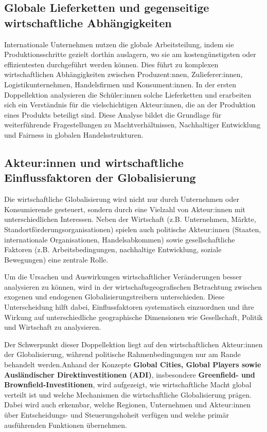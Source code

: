\subsection{Globale Lieferketten und gegenseitige wirtschaftliche Abhängigkeiten}
Internationale Unternehmen nutzen die globale Arbeitsteilung, indem sie Produktionsschritte gezielt dorthin auslagern, wo sie am kostengünstigsten oder effizientesten durchgeführt werden können. Dies führt zu komplexen wirtschaftlichen Abhängigkeiten zwischen Produzent:nnen, Zulieferer:innen, Logistikunternehmen, Handelsfirmen und Konsument:innen. In der ersten Doppellektion analysieren die Schüler:innen solche Lieferketten und erarbeiten sich ein Verständnis für die vielschichtigen Akteur:innen, die an der Produktion eines Produkts beteiligt sind. Diese Analyse bildet die Grundlage für weiterführende Fragestellungen zu Machtverhältnissen, Nachhaltiger Entwicklung und Fairness in globalen Handelsstrukturen.

\subsection{Akteur:innen und wirtschaftliche Einflussfaktoren der Globalisierung}
Die wirtschaftliche Globalisierung wird nicht nur durch Unternehmen oder Konsumierende gesteuert, sondern durch eine Vielzahl von Akteur:innen mit unterschiedlichen Interessen. Neben der Wirtschaft (z.B. Unternehmen, Märkte, Standortförderungsorganisationen) spielen auch politische Akteur:innen (Staaten, internationale Organisationen, Handelsabkommen) sowie gesellschaftliche Faktoren (z.B. Arbeitsbedingungen, nachhaltige Entwicklung, soziale Bewegungen) eine zentrale Rolle.

Um die Ursachen und Auswirkungen wirtschaftlicher Veränderungen besser analysieren zu können, wird in der wirtschaftsgeografischen Betrachtung zwischen exogenen und endogenen Globalisierungstreibern unterschieden. Diese Unterscheidung hilft dabei, Einflussfaktoren systematisch einzuordnen und ihre Wirkung auf unterschiedliche geographische Dimensionen wie Gesellschaft, Politik und Wirtschaft zu analysieren.

Der Schwerpunkt dieser Doppellektion liegt auf den wirtschaftlichen Akteur:innen der Globalisierung, während politische Rahmenbedingungen nur am Rande behandelt werden.Anhand der Konzepte \textbf{Global Cities, Global Players sowie Ausländischer Direktinvestitionen (ADI)}, insbesondere \textbf{Greenfield- und Brownfield-Investitionen}, wird aufgezeigt, wie wirtschaftliche Macht global verteilt ist und welche Mechanismen die wirtschaftliche Globalisierung prägen. Dabei wird auch erkennbar, welche Regionen, Unternehmen und Akteur:innen über Entscheidungs- und Steuerungshoheit verfügen und welche primär ausführenden Funktionen übernehmen.

